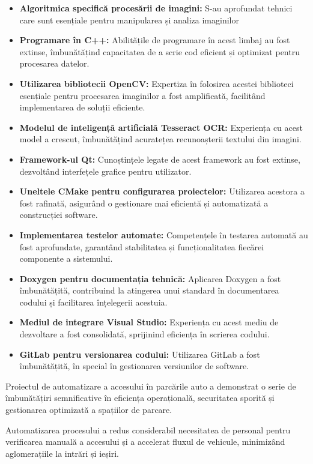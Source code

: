 \documentclass[a4paper,12pt]{report}
\begin{document}
\begin{itemize}
    \item \textbf{Algoritmica specifică procesării de imagini:} S-au aprofundat tehnici care sunt esențiale pentru manipularea și analiza imaginilor
    \item \textbf{Programare în C++:} Abilitățile de programare în acest limbaj au fost extinse, îmbunătățind capacitatea de a scrie cod eficient și optimizat pentru procesarea datelor.
    \item \textbf{Utilizarea bibliotecii OpenCV:} Expertiza în folosirea acestei biblioteci esențiale pentru procesarea imaginilor a fost amplificată, facilitând implementarea de soluții eficiente.
    \item \textbf{Modelul de inteligență artificială Tesseract OCR:} Experiența cu acest model a crescut, îmbunătățind acuratețea recunoașterii textului din imagini.
    \item \textbf{Framework-ul Qt:} Cunoștințele legate de acest framework au fost extinse, dezvoltând interfețele grafice pentru utilizator.
    \item \textbf{Uneltele CMake pentru configurarea proiectelor:} Utilizarea acestora a fost rafinată, asigurând o gestionare mai eficientă și automatizată a construcției software.
    \item \textbf{Implementarea testelor automate:} Competențele în testarea automată au fost aprofundate, garantând stabilitatea și funcționalitatea fiecărei componente a sistemului.
    \item \textbf{Doxygen pentru documentația tehnică:} Aplicarea Doxygen a fost îmbunătățită, contribuind la atingerea unui standard în documentarea codului și facilitarea înțelegerii acestuia.
    \item \textbf{Mediul de integrare Visual Studio:} Experiența cu acest mediu de dezvoltare a fost consolidată, sprijinind eficiența în scrierea codului.
    \item \textbf{GitLab pentru versionarea codului:} Utilizarea GitLab a fost îmbunătățită, în special în gestionarea versiunilor de software.
\end{itemize}

Proiectul de automatizare a accesului în parcările auto a demonstrat o serie de îmbunătățiri semnificative în eficiența operațională, securitatea sporită și gestionarea optimizată a spațiilor de parcare.

Automatizarea procesului a redus considerabil necesitatea de personal pentru verificarea manuală a accesului și a accelerat fluxul de vehicule, minimizând aglomerațiile la intrări și ieșiri.
\end{document}
